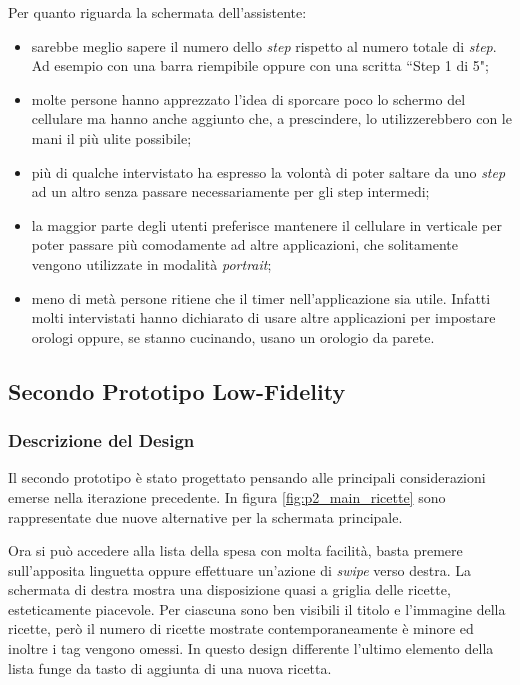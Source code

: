 Per quanto riguarda la schermata dell'assistente:
\begin{itemize}
  \item sarebbe meglio sapere il numero dello \textit{step} rispetto al numero totale di \textit{step}.
    Ad esempio con una barra riempibile oppure con una scritta ``Step 1 di 5";

  \item molte persone hanno apprezzato l'idea di sporcare poco lo schermo del cellulare ma hanno anche aggiunto che, a prescindere, lo utilizzerebbero con le mani il più ulite possibile;

  \item più di qualche intervistato ha espresso la volontà di poter saltare da uno \textit{step} ad un altro senza passare necessariamente per gli step intermedi;

  \item la maggior parte degli utenti preferisce mantenere il cellulare in verticale per poter passare più comodamente ad altre applicazioni, che solitamente vengono utilizzate in modalità \textit{portrait};

  \item meno di metà persone ritiene che il timer nell'applicazione sia utile.
    Infatti molti intervistati hanno dichiarato di usare altre applicazioni per impostare orologi oppure, se stanno cucinando, usano un orologio da parete.
\end{itemize}


\clearpage
\subsection{Secondo Prototipo Low-Fidelity}
\subsubsection{Descrizione del Design}
Il secondo prototipo è stato progettato pensando alle principali considerazioni emerse nella iterazione precedente.
In figura \ref{fig:p2_main_ricette} sono rappresentate due nuove alternative per la schermata principale.

Ora si può accedere alla lista della spesa con molta facilità, basta premere sull'apposita linguetta oppure effettuare un'azione di \textit{swipe} verso destra.
La schermata di destra mostra una disposizione quasi a griglia delle ricette, esteticamente piacevole.
Per ciascuna sono ben visibili il titolo e l'immagine della ricette, però il numero di ricette mostrate contemporaneamente è minore ed inoltre i tag vengono omessi.
In questo design differente l'ultimo elemento della lista funge da tasto di aggiunta di una nuova ricetta.

